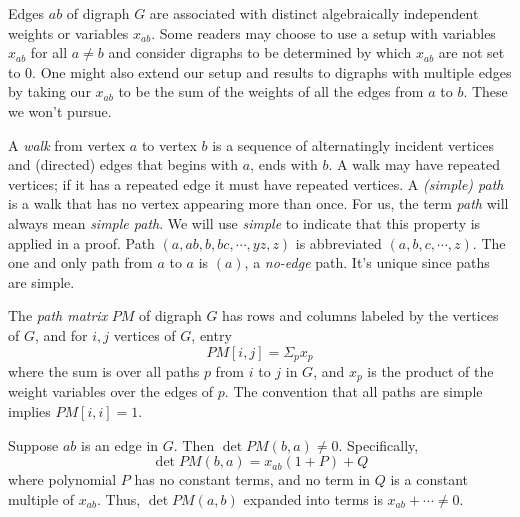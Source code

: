 \documentclass[12pt]{article}
\begin{document}
Edges $ab$ of digraph $G$ are associated with distinct algebraically independent weights or
variables $x_{ab}$.  Some readers may choose to use a setup with variables $x_{ab}$
for all $a\neq b$ and consider digraphs to be determined by which $x_{ab}$ are not set to 0.  One
might also extend our setup and results
to digraphs with multiple edges by taking our $x_{ab}$ to be the
sum of the weights of all the edges from $a$ to $b$.  These we won't pursue. 

A \emph{walk} from vertex $a$ to vertex $b$ is a sequence of alternatingly
incident vertices and (directed) edges that begins with $a$, ends with $b$.  A walk may have
repeated vertices; if it has a repeated edge it must have repeated vertices.  A \emph{(simple) path}
is a walk that has no vertex appearing more than once.  For us, the term \emph{path} will always
mean \emph{simple path}. We will use \emph{simple} to indicate that this property is applied
in a proof.
Path 
$(a, ab, b, bc, \cdots, yz, z)$ is abbreviated
$(a, b, c, \cdots, z)$. The one and only path from $a$ to $a$ is $(a)$, a \emph{no-edge}
path.  It's unique since paths are simple.


\begin{definition}
  The \emph{path matrix}\cite{MR311496} $PM$ of digraph $G$ has rows and columns labeled by the vertices of $G$,
  and for $i,j$ vertices of $G$, entry
  \[ PM[i,j] = \Sigma_px_p
  \]
  where the sum is over all paths $p$ from $i$ to $j$ in $G$, and $x_p$ is the product of
  the weight variables over the edges of $p$.  The convention that all paths are simple implies
  $PM[i,i] = 1$.
\end{definition}

\begin{proposition}\label{Prop:GivenEdge}
  Suppose $ab$ is an edge in $G$. Then $\det PM(b,a) \neq 0$. Specifically,
  \[
  \det PM(b,a) = x_{ab}(1 + P) + Q
  \]
  where polynomial $P$ has no constant terms, and no term in $Q$ is a constant
  multiple of $x_{ab}$.  Thus, $\det PM(a,b)$ expanded into terms is
  $x_{ab} + \cdots \neq 0$.
\end{proposition}
\end{document}
